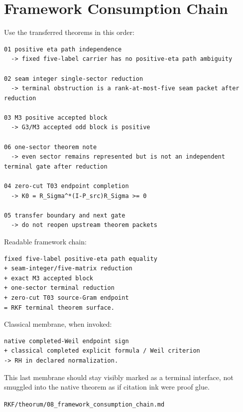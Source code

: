 \hypertarget{framework-consumption-chain}{%
\chapter{Framework Consumption Chain}\label{framework-consumption-chain}}

Use the transferred theorems in this order:

\begin{verbatim}
01 positive eta path independence
  -> fixed five-label carrier has no positive-eta path ambiguity

02 seam integer single-sector reduction
  -> terminal obstruction is a rank-at-most-five seam packet after reduction

03 M3 positive accepted block
  -> G3/M3 accepted odd block is positive

06 one-sector theorem note
  -> even sector remains represented but is not an independent terminal gate after reduction

04 zero-cut T03 endpoint completion
  -> K0 = R_Sigma^*(I-P_src)R_Sigma >= 0

05 transfer boundary and next gate
  -> do not reopen upstream theorem packets
\end{verbatim}

Readable framework chain:

\begin{verbatim}
fixed five-label positive-eta path equality
+ seam-integer/five-matrix reduction
+ exact M3 accepted block
+ one-sector terminal reduction
+ zero-cut T03 source-Gram endpoint
= RKF terminal theorem surface.
\end{verbatim}

Classical membrane, when invoked:

\begin{verbatim}
native completed-Weil endpoint sign
+ classical completed explicit formula / Weil criterion
-> RH in declared normalization.
\end{verbatim}

This last membrane should stay visibly marked as a terminal interface, not smuggled into the native theorem as if citation ink were proof glue.

\begin{flushright}\small\texttt{RKF/theorum/08\_framework\_consumption\_chain.md}\end{flushright}
